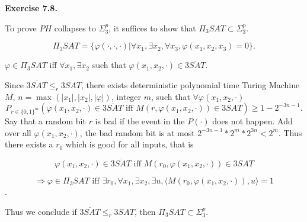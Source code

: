 \documentclass[a4paper]{article}
\newenvironment{exercise}[1]{
	\par
	\noindent\textbf{Exercise #1.}\quad
}{
	\par
	\bigskip
}
\begin{document}
\begin{exercise}{7.8}
To prove $PH$ collapses to $\Sigma_3^p$, it suffices to show that $\Pi_3 SAT\subset \Sigma_3^p$.

$$
\Pi_3 SAT=\{\varphi(\cdot,\cdot,\cdot)| \forall x_1, \exists x_2, \forall x_3, \varphi(x_1,x_2,x_3)=0\}.
$$

$\varphi\in \Pi_3SAT$ iff $\forall x_1, \exists x_2$ such that $\varphi(x_1,x_2,\cdot)\in \overline{3SAT}$.

Since $\overline{3SAT}\leq_r 3SAT$, there exists deterministic polynomial time Turing Machine $M$,  $n=\max(|x_1|,|x_2|,|\varphi|)$, integer $m$, such that $\forall \varphi(x_1,x_2,\cdot)$
$$
P_{r\in\{0,1\}^m}(  \varphi(x_1,x_2,\cdot)\in \overline{3SAT} \text{ iff } M(r,\varphi(x_1,x_2,\cdot))\in 3SAT)\geq 1- 2^{-3n-1}.
$$ 
Say that a random bit $r$ is bad if the event in the $P(\cdot)$ does not happen. Add over all  $\varphi(x_1,x_2,\cdot)$, the bad random bit is at most $2^{-3n-1}*2^{m}*2^{3n}<2^{m}$. Thus there exists a $r_0$ which is good for all inputs, that is

$$
 \varphi(x_1,x_2,\cdot)\in \overline{3SAT} \text{ iff } M(r_0,\varphi(x_1,x_2,\cdot))\in 3SAT
$$

$$
\Rightarrow 
\varphi\in \Pi_3SAT \text{ iff } \exists r_0, \forall x_1, \exists x_2, \exists u,   \langle M(r_0,\varphi(x_1,x_2,\cdot)), u\rangle =1
$$.

 


Thus we conclude if $\overline{3SAT}\leq_r 3SAT$, then $\Pi_3 SAT\subset \Sigma_3^p$.
\end{exercise}
\end{document}
